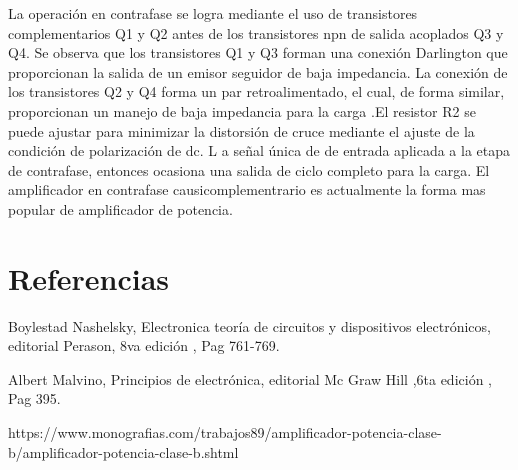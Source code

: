 \documentclass[10pt,a4paper]{article}
\begin{document}
La operación en contrafase se logra mediante el uso de transistores complementarios Q1 y Q2 antes de los transistores npn de salida acoplados Q3 y Q4. Se observa que los transistores Q1 y Q3 forman una conexión Darlington que proporcionan la salida de un emisor seguidor de baja impedancia. La conexión de los transistores Q2 y Q4 forma un par retroalimentado, el cual, de forma similar, proporcionan un manejo de baja impedancia para la carga .El resistor R2 se puede ajustar para minimizar la distorsión de cruce mediante el ajuste de la condición de polarización de dc. L a señal única de de entrada aplicada a la etapa de contrafase, entonces ocasiona una salida de ciclo completo para la carga. El amplificador en contrafase causicomplementrario es actualmente la forma mas popular de amplificador de potencia.\\

\section{Referencias}
Boylestad Nashelsky, Electronica teoría de circuitos y dispositivos electrónicos, editorial Perason, 8va edición , Pag 761-769.

Albert Malvino, Principios de electrónica, editorial Mc Graw Hill ,6ta edición , Pag 395.


{https://www.monografias.com/trabajos89/amplificador-potencia-clase-b/amplificador-potencia-clase-b.shtml}

\end{document}
